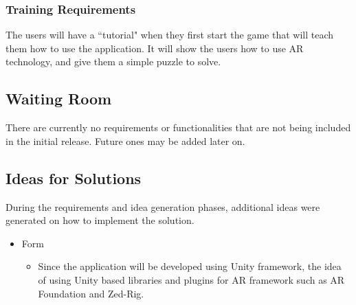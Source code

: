 \documentclass[12pt]{article}
\begin{document}
\subsubsection{Training Requirements}
The users will have a ``tutorial" when they first start the game that will teach them how to use the application. It will show the users how to use AR technology, and give them a simple puzzle to solve.

\subsection{Waiting Room}
There are currently no requirements or functionalities that are not being included in the initial release. Future ones may be added later on.

\subsection{Ideas for Solutions}
During the requirements and idea generation phases, additional ideas were generated on how to implement the solution.
\begin{itemize}
    \item Form
    \begin{itemize}
        \item Since the application will be developed using Unity framework, the idea of using Unity based libraries and plugins for AR framework such as AR Foundation and Zed-Rig.
    \end{itemize}
\end{itemize}

\end{document}
